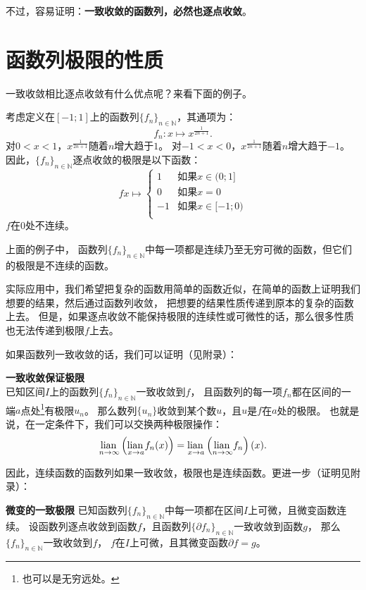 \documentclass[12pt,UTF8]{ctexbook}
\begin{document}
不过，容易证明：\textbf{一致收敛的函数列，必然也逐点收敛}。

\section{函数列极限的性质}

一致收敛相比逐点收敛有什么优点呢？来看下面的例子。

\begin{ex}
    考虑定义在$[-1;1]$上的函数列$\{f_n\}_{n\in\mathbb{N}}$，其通项为：
    $$ f_n: x \mapsto x^{\frac{1}{2n+1}}. $$
    对$0<x<1$，$x^{\frac{1}{2n+1}}$随着$n$增大趋于$1$。
    对$-1<x<0$，$x^{\frac{1}{2n+1}}$随着$n$增大趋于$-1$。
    因此，$\{f_n\}_{n\in\mathbb{N}}$逐点收敛的极限是以下函数：
    $$
    f x\mapsto \left\{
        \begin{array}{ll}
            1 & \mbox{如果} x \in (0; 1] \\
            0 & \mbox{如果} x = 0 \\
            -1 & \mbox{如果} x \in [-1; 0) \\
        \end{array}
    \right.
    $$
    $f$在$0$处不连续。
\end{ex}
上面的例子中，
函数列$\{f_n\}_{n\in\mathbb{N}}$中每一项都是连续乃至无穷可微的函数，但它们的极限是不连续的函数。

实际应用中，我们希望把复杂的函数用简单的函数近似，在简单的函数上证明我们想要的结果，然后通过函数列收敛，
把想要的结果性质传递到原本的复杂的函数上去。
但是，如果逐点收敛不能保持极限的连续性或可微性的话，那么很多性质也无法传递到极限$f$上去。

如果函数列一致收敛的话，我们可以证明（见附录）：
\begin{tm}\textbf{一致收敛保证极限}\label{tm:2-1-10}\\
    已知区间$I$上的函数列$\{f_n\}_{n\in\mathbb{N}}$一致收敛到$f$，
    且函数列的每一项$f_n$都在区间的一端$a$点处\footnote{也可以是无穷远处。}有极限$u_n$。
    那么数列$\{u_n\}$收敛到某个数$u$，且$u$是$f$在$a$处的极限。
    也就是说，在一定条件下，我们可以交换两种极限操作：
    $$ \underset{n\to \infty}{\operatorname{lian}\,} \left( \underset{x\to a}{\operatorname{lian}\,} f_n(x) \right) = \underset{x\to a}{\operatorname{lian}\,} \left(\underset{n\to \infty}{\operatorname{lian}\,} f_n \right) (x). $$
\end{tm}

因此，连续函数的函数列如果一致收敛，极限也是连续函数。更进一步（证明见附录）：

\begin{tm}{\textbf{微变的一致极限}}\label{tm:2-1-20}
    已知函数列$\{f_n\}_{n\in\mathbb{N}}$中每一项都在区间$I$上可微，且微变函数连续。
    设函数列逐点收敛到函数$f$，且函数列$\{\partial f_n\}_{n\in\mathbb{N}}$一致收敛到函数$g$，
    那么$\{f_n\}_{n\in\mathbb{N}}$一致收敛到$f$，
    $f$在$I$上可微，且其微变函数$\partial f = g$。
\end{tm}
\end{document}
